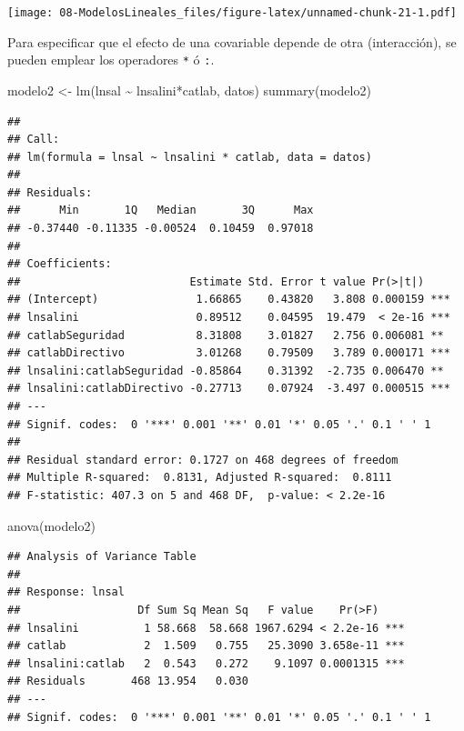 \documentclass[
]{book}
\newenvironment{Shaded}{\begin{snugshade}}{\end{snugshade}}
\newcommand{\FunctionTok}[1]{\textcolor[rgb]{0.00,0.00,0.00}{#1}}
\newcommand{\NormalTok}[1]{#1}
\newcommand{\OtherTok}[1]{\textcolor[rgb]{0.56,0.35,0.01}{#1}}
\newcommand{\SpecialCharTok}[1]{\textcolor[rgb]{0.00,0.00,0.00}{#1}}
\theoremstyle{break}
\begin{document}
\texttt{[image: 08-ModelosLineales\_files/figure-latex/unnamed-chunk-21-1.pdf]}

Para especificar que el efecto de una covariable depende de otra (interacción),
se pueden emplear los operadores \texttt{*} ó \texttt{:}.

\begin{Shaded}
\begin{Highlighting}[]
\NormalTok{modelo2 }\OtherTok{\textless{}{-}} \FunctionTok{lm}\NormalTok{(lnsal }\SpecialCharTok{\textasciitilde{}}\NormalTok{ lnsalini}\SpecialCharTok{*}\NormalTok{catlab, datos)}
\FunctionTok{summary}\NormalTok{(modelo2)}
\end{Highlighting}
\end{Shaded}

\begin{verbatim}
## 
## Call:
## lm(formula = lnsal ~ lnsalini * catlab, data = datos)
## 
## Residuals:
##      Min       1Q   Median       3Q      Max 
## -0.37440 -0.11335 -0.00524  0.10459  0.97018 
## 
## Coefficients:
##                          Estimate Std. Error t value Pr(>|t|)    
## (Intercept)               1.66865    0.43820   3.808 0.000159 ***
## lnsalini                  0.89512    0.04595  19.479  < 2e-16 ***
## catlabSeguridad           8.31808    3.01827   2.756 0.006081 ** 
## catlabDirectivo           3.01268    0.79509   3.789 0.000171 ***
## lnsalini:catlabSeguridad -0.85864    0.31392  -2.735 0.006470 ** 
## lnsalini:catlabDirectivo -0.27713    0.07924  -3.497 0.000515 ***
## ---
## Signif. codes:  0 '***' 0.001 '**' 0.01 '*' 0.05 '.' 0.1 ' ' 1
## 
## Residual standard error: 0.1727 on 468 degrees of freedom
## Multiple R-squared:  0.8131, Adjusted R-squared:  0.8111 
## F-statistic: 407.3 on 5 and 468 DF,  p-value: < 2.2e-16
\end{verbatim}

\begin{Shaded}
\begin{Highlighting}[]
\FunctionTok{anova}\NormalTok{(modelo2)}
\end{Highlighting}
\end{Shaded}

\begin{verbatim}
## Analysis of Variance Table
## 
## Response: lnsal
##                  Df Sum Sq Mean Sq   F value    Pr(>F)    
## lnsalini          1 58.668  58.668 1967.6294 < 2.2e-16 ***
## catlab            2  1.509   0.755   25.3090 3.658e-11 ***
## lnsalini:catlab   2  0.543   0.272    9.1097 0.0001315 ***
## Residuals       468 13.954   0.030                        
## ---
## Signif. codes:  0 '***' 0.001 '**' 0.01 '*' 0.05 '.' 0.1 ' ' 1
\end{verbatim}
\end{document}
